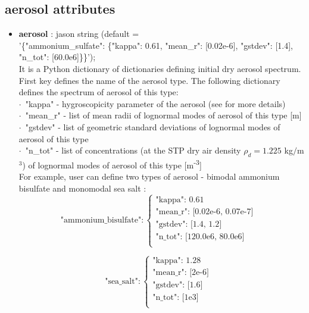 \documentclass[11pt]{article}
\begin{document}
\subsection{aerosol attributes}

\begin{itemize}
  \item \textbf{aerosol} : jason string (default =\\ '\{"ammonium\_sulfate": \{"kappa": 0.61, "mean\_r": [0.02e-6], "gstdev": [1.4], "n\_tot": [60.0e6]\}\}');\\ 

    \vspace{-.9em}
    It is a Python dictionary of dictionaries defining initial dry aerosol spectrum.
    First key defines the name of the aerosol type. The following dictionary defines the spectrum of aerosol of this type:\\
      \indent $\cdot$\ "kappa" - hygroscopicity parameter of the aerosol (see \citep{Petters_et_al_2007} for more details)\\
      \indent $\cdot$\ "mean\_r" - list of mean radii of lognormal modes of aerosol of this type [m]\\
      \indent $\cdot$\ "gstdev" - list of geometric standard deviations of lognormal modes of aerosol of this type \\
      \indent $\cdot$\ "n\_tot" - list of concentrations (at the STP dry air density $\rho_d = 1.225$ kg$/$m$^3$) of lognormal modes of aerosol of this type [m\textsuperscript{-3}] \\

    \vspace{-.9em}
    For example, user can define two types of aerosol - bimodal ammonium bisulfate and monomodal sea salt : \\ 
  
$$
\mbox{"ammonium\_bisulfate"}: \left\{ \begin{array}{ll}
\mbox{"kappa": 0.61}  & \textrm{}\\
\mbox{"mean\_r": [0.02e-6, 0.07e-7]}  & \textrm{}\\
\mbox{"gstdev": [1.4, 1.2]} & \textrm{}\\
\mbox{"n\_tot": [120.0e6, 80.0e6]} & \textrm{}\\
\end{array} \right.
$$

$$
\mbox{"sea\_salt"}: \left\{ \begin{array}{ll}
\mbox{"kappa": 1.28}  & \textrm{}\\
\mbox{"mean\_r": [2e-6]}  & \textrm{}\\
\mbox{"gstdev": [1.6]} & \textrm{}\\
\mbox{"n\_tot": [1e3]} & \textrm{}\\
\end{array} \right.
$$

\end{itemize}
\end{document}
